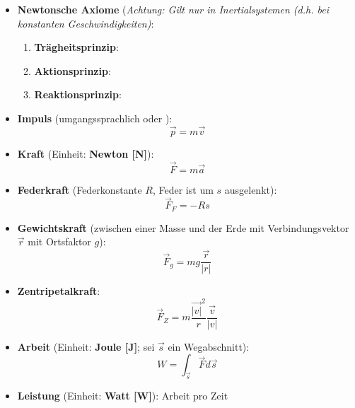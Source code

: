 \begin{itemize}
	\item \textbf{Newtonsche Axiome} (\textit{Achtung: Gilt nur in Inertialsystemen (d.h. bei konstanten Geschwindigkeiten)}:
	\begin{enumerate}
		\item \textbf{Trägheitsprinzip}: 
		\item \textbf{Aktionsprinzip}: 
		\item \textbf{Reaktionsprinzip}: 
	\end{enumerate}
	\item \textbf{Impuls} (umgangssprachlich  oder ):
	\begin{equation}
		\vec{p} = m\vec{v}
	\end{equation}
	\item \textbf{Kraft} (Einheit: \textbf{Newton [N]}):
	\begin{equation}
		\vec{F} = m\vec{a}
	\end{equation}
	\item \textbf{Federkraft} (Federkonstante $R$, Feder ist um $s$ ausgelenkt):
	\begin{equation}
		\vec{F}_F = -Rs
	\end{equation}
	\item \textbf{Gewichtskraft} (zwischen einer Masse und der Erde mit Verbindungsvektor $\vec{r}$ mit Ortsfaktor $g$):
	\begin{equation}
		\vec{F}_g = mg\frac{\vec{r}}{|r|}
	\end{equation}
	\item \textbf{Zentripetalkraft}:
	\begin{equation}
		\vec{F}_Z = m\frac{\vec{|v|}^2}{r}\frac{\vec{v}}{|v|}
	\end{equation}
	\item \textbf{Arbeit} (Einheit: \textbf{Joule [J]}; sei $\vec{s}$ ein Wegabschnitt):
	\begin{equation}
		W = \int_{\vec{s}} \vec{F}d\vec{s}
	\end{equation}
	\item \textbf{Leistung} (Einheit: \textbf{Watt [W]}): Arbeit pro Zeit

\end{itemize}

